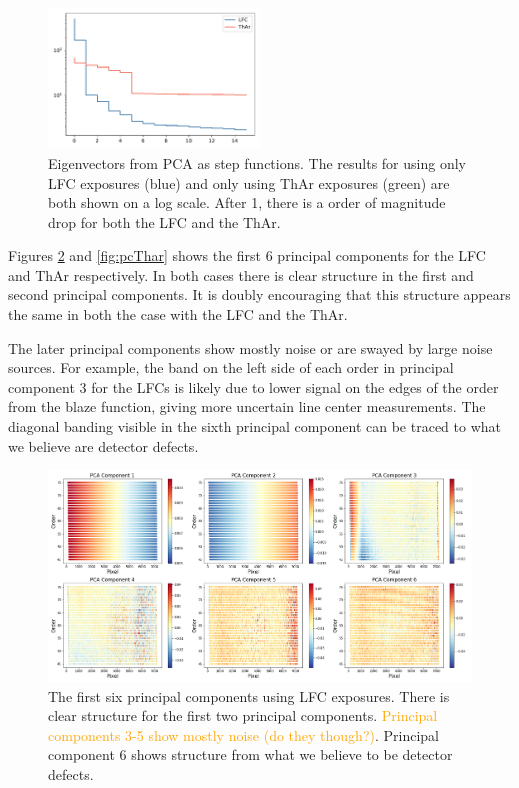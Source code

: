 \documentclass[12pt, letterpaper]{article}
\newcommand{\lz}[1]{\textcolor{orange}{#1}}
\begin{document}
\begin{figure}[h]
\centering
\includegraphics[width=0.5\textwidth]{Figures/ss.pdf}
\caption{Eigenvectors from PCA as step functions.  The results for using only LFC exposures (blue) and only using ThAr exposures (green) are both shown on a log scale.  After 1, there is a order of magnitude drop for both the LFC and the ThAr.}
\label{fig:eigenvectors}
\end{figure} 

Figures \ref{fig:pcLfc} and \ref{fig:pcThar} shows the first 6 principal components for the LFC and ThAr respectively.  In both cases there is clear structure in the first and second principal components.  It is doubly encouraging that this structure appears the same in both the case with the LFC and the ThAr.

The later principal components show mostly noise or are swayed by large noise sources.  For example, the band on the left side of each order in principal component 3 for the LFCs is likely due to lower signal on the edges of the order from the blaze function, giving more uncertain line center measurements.  The diagonal banding visible in the sixth principal component can be traced to what we believe are detector defects.

\begin{figure}[t]
\centering
\includegraphics[width=\textwidth]{Figures/pcsLfc6.png}
\caption{The first six principal components using LFC exposures.  There is clear structure for the first two principal components.  \lz{Principal components 3-5 show mostly noise (do they though?)}.  Principal component 6 shows structure from what we believe to be detector defects.}
\label{fig:pcLfc}
\end{figure}
\end{document}

